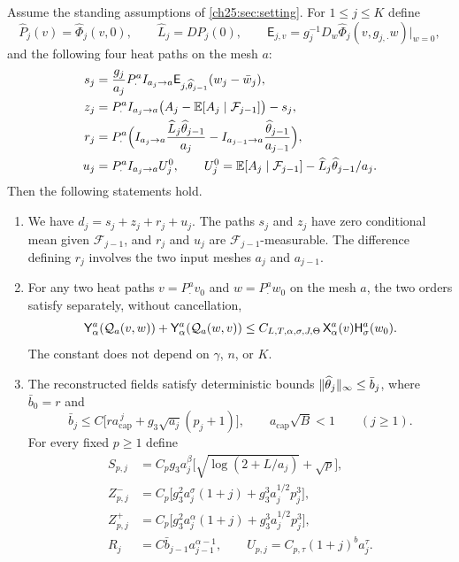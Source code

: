 \begin{lemma}\label{ch25:lem:ordered-product-inventory}
Assume the standing assumptions of \cref{ch25:sec:setting}. For $1\le j\le K$ define
\[
 \widehat P_j(v)=\widehat\Phi_j(v,0),\qquad
 \widehat L_j=D\widehat P_j(0),\qquad
 \mathsf E_{j,v}=g_j^{-1}D_w\widehat\Phi_j(v,g_{j,\cdot}w)|_{w=0},
\]
and the following four heat paths on the mesh $a$:
\[
\begin{split}
 s_j&=\frac{g_j}{a_j}P_\cdot^a I_{a_j\to a}\mathsf E_{j,\widehat\theta_{j-1}}(w_j-\bar w_j),\\
 z_j&=P_\cdot^a I_{a_j\to a}\bigl(A_j-\mathbb E[A_j\mid\mathcal F_{j-1}]\bigr)-s_j,\\
 r_j&=P_\cdot^a\Bigl(I_{a_j\to a}\frac{\widehat L_j\widehat\theta_{j-1}}{a_j}-I_{a_{j-1}\to a}\frac{\widehat\theta_{j-1}}{a_{j-1}}\Bigr),\\
 u_j&=P_\cdot^a I_{a_j\to a}U_j^0,\qquad U_j^0=\mathbb E[A_j\mid\mathcal F_{j-1}]-\widehat L_j\widehat\theta_{j-1}/a_j.
\end{split}
\]
Then the following statements hold.
\begin{enumerate}
\item We have $d_j=s_j+z_j+r_j+u_j$. The paths $s_j$ and $z_j$ have zero conditional mean given $\mathcal F_{j-1}$, and $r_j$ and $u_j$ are $\mathcal F_{j-1}$-measurable. The difference defining $r_j$ involves the two input meshes $a_j$ and $a_{j-1}$.
\item For any two heat paths $v=P^a_\cdot v_0$ and $w=P^a_\cdot w_0$ on the mesh $a$, the two orders satisfy separately, without cancellation,
\[
 \mathsf Y_{\alpha}^{a}(\mathcal Q_{a}(v,w))+\mathsf Y_{\alpha}^{a}(\mathcal Q_{a}(w,v))\le C_{L,T,\alpha,\sigma,J,\Theta}\,\mathsf X_{\alpha}^{a}(v)\mathsf H_{\sigma}^{a}(w_0).
\]
The constant does not depend on $\gamma$, $n$, or $K$.
\item The reconstructed fields satisfy deterministic bounds $\lVert \widehat\theta_j\rVert_\infty\le\bar b_j$, where $\bar b_0=r$ and
\[
 \bar b_j\le C\bigl[ra_{\mathrm{cap}}^{\,j}+g_3\sqrt{a_j}(p_j+1)\bigr],\qquad a_{\mathrm{cap}}\sqrt B<1\qquad(j\ge1).
\]
For every fixed $p\ge1$ define
\[
\begin{split}
 S_{p,j}&=C_pg_3a_j^\beta\bigl[\sqrt{\log(2+L/a_j)}+\sqrt p\bigr],\\
 Z^-_{p,j}&=C_p\bigl[g_3^2a_j^\sigma(1+j)+g_3^3a_j^{1/2}p_j^3\bigr],\\
 Z^+_{p,j}&=C_p\bigl[g_3^2a_j^\alpha(1+j)+g_3^3a_j^{1/2}p_j^3\bigr],\\
 R_j&=C\bar b_{j-1}a_{j-1}^{\alpha-1},\qquad U_{p,j}=C_{p,\tau}(1+j)^ba_j^\tau.

\end{split}\]
\end{enumerate}
\end{lemma}
